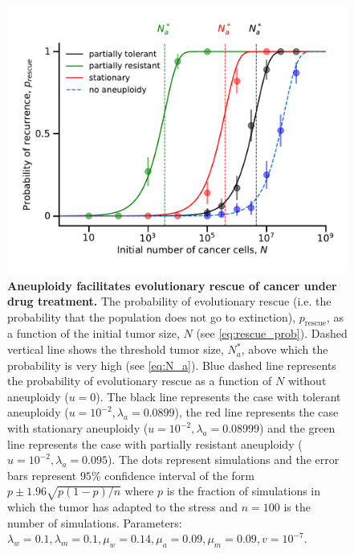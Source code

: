\documentclass[12pt]{extarticle}
\newcommand{\presc}{p_\text{rescue}}
\begin{document}
\begin{figure}
\includegraphics[width=1\textwidth]{Figures/ProbvNPlot.pdf}
\caption{\textbf{Aneuploidy facilitates evolutionary rescue of cancer under drug treatment.}
The probability of evolutionary rescue (i.e. the probability that the population does not go to extinction), $\presc$, as a function of the initial tumor size, $N$ (see \cref{eq:rescue_prob}). Dashed vertical line shows the threshold tumor size, $N_a^*$, above which the probability is very high (see \cref{eq:N_a}). Blue dashed line represents the probability of evolutionary rescue as a function of $N$ without aneuploidy ($u=0$). The black line represents the case with tolerant aneuploidy ($u=10^{-2}, \lambda_a=0.0899$), the red line represents the case with stationary aneuploidy ($u=10^{-2}, \lambda_a=0.08999$) and the green line represents the case with partially resistant aneuploidy ($u=10^{-2}, \lambda_a=0.095$). The dots represent simulations and the error bars represent $95\%$ confidence interval of the form $p\pm1.96\sqrt{p\left(1-p\right)/n}$ where $p$ is the fraction of simulations in which the tumor has adapted to the stress and $n=100$ is the number of simulations. Parameters: $\lambda_w=0.1,\lambda_m=0.1,\mu_w=0.14,\mu_a=0.09,\mu_m=0.09, v=10^{-7}$.}
\label{rescue_prob}
\end{figure}
\end{document}
